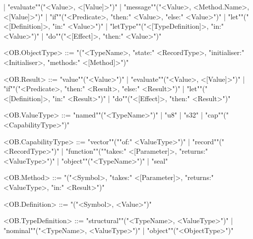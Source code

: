 \documentclass[main.tex]{subfiles}
\begin{document}
\begin{grammar}
						| "evaluate""("<Value>, <[Value]>")"
						| "message""("<Value>, <Method.Name>, <[Value]>")"
						| "if""("<Predicate>, "then:" <Value>, "else:" <Value>")"
						| "let""("<[Definition]>, "in:" <Value>")"
						| "letType""("<[TypeDefinition]>, "in:" <Value>")"
						| "do""("<[Effect]>, "then:" <Value>")"
				\par
				<OB.ObjectType> ::=
							"("<TypeName>, "state:" <RecordType>, "initialiser:" <Initialiser>, "methods:" <[Method]>")"
				\par
				<OB.Result> ::=
						"value""("<Value>")"
						| "evaluate""("<Value>, <[Value]>")"
						| "if""("<Predicate>, "then:" <Result>, "else:" <Result>")"
						| "let""("<[Definition]>, "in:" <Result>")"
						| "do""("<[Effect]>, "then:" <Result>")"
				\par
				<OB.ValueType> ::=
						"named""("<TypeName>")"
						| "u8"
						| "s32"
						| "cap""("<CapabilityType>")"
				\par
				<OB.CapabilityType> ::=
						"vector""(""of:" <ValueType>")"
						| "record""("<RecordType>")"
						| "function""(""takes:" <[Parameter]>, "returns:" <ValueType>")"
						| "object""("<TypeName>")"
						| "seal"
				\par
				<OB.Method> ::=
							"("<Symbol>, "takes:" <[Parameter]>, "returns:" <ValueType>, "in:" <Result>")"
				\par
				<OB.Definition> ::=
							"("<Symbol>, <Value>")"
				\par
				<OB.TypeDefinition> ::=
						"structural""("<TypeName>, <ValueType>")"
						| "nominal""("<TypeName>, <ValueType>")"
						| "object""("<ObjectType>")"
				\par
\end{grammar}
\par
\end{document}
